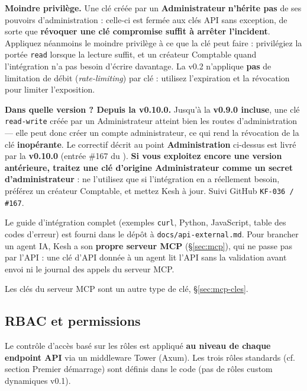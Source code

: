 \documentclass[a4paper,11pt,oneside]{article}
\begin{document}
\begin{keshwarning}
\textbf{Moindre privilège.} Une clé créée par un \textbf{Administrateur} \textbf{n'hérite pas} de ses pouvoirs d'administration : celle-ci est fermée aux clés API sans exception, de sorte que \textbf{révoquer une clé compromise suffit à arrêter l'incident}. Appliquez néanmoins le moindre privilège à ce que la clé peut faire : privilégiez la portée \texttt{read} lorsque la lecture suffit, et un créateur Comptable quand l'intégration n'a pas besoin d'écrire davantage. La v0.2 n'applique \textbf{pas} de limitation de débit (\emph{rate-limiting}) par clé : utilisez l'expiration et la révocation pour limiter l'exposition.

\medskip
\begin{keshwarning}
\textbf{Dans quelle version ? Depuis la v0.10.0.} Jusqu'à la \textbf{v0.9.0 incluse}, une clé \texttt{read-write} créée par un Administrateur atteint bien les routes d'administration --- elle peut donc créer un compte administrateur, ce qui rend la révocation de la clé \textbf{inopérante}. Le correctif décrit au point \textbf{Administration} ci-dessus est livré par la \textbf{v0.10.0} (entrée \#167 du ). \textbf{Si vous exploitez encore une version antérieure, traitez une clé d'origine Administrateur comme un secret d'administrateur} : ne l'utilisez que si l'intégration en a réellement besoin, préférez un créateur Comptable, et mettez Kesh à jour. Suivi GitHub \texttt{KF-036 / \#167}.
\end{keshwarning}
\end{keshwarning}

Le guide d'intégration complet (exemples \texttt{curl}, Python, JavaScript, table des codes d'erreur) est fourni dans le dépôt à \texttt{docs/api-external.md}. Pour brancher un agent IA, Kesh a son \textbf{propre serveur MCP} (\S\ref{sec:mcp}), qui ne passe pas par l'API : une clé d'API donnée à un agent lit l'API sans la validation avant envoi ni le journal des appels du serveur MCP.

Les clés du serveur MCP sont un autre type de clé, \S\ref{sec:mcp-cles}.

\subsection{RBAC et permissions}

Le contrôle d'accès basé sur les rôles est appliqué \textbf{au niveau de chaque endpoint API} via un middleware Tower (Axum). Les trois rôles standards (cf. section Premier démarrage) sont définis dans le code (pas de rôles custom dynamiques v0.1).
\end{document}
